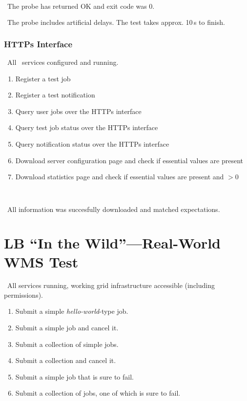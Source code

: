 \how\ 

\result\ The probe has returned OK and exit code was 0.

\note\ The probe includes artificial delays. The test takes approx. 10\,s to finish.

\subsubsection{HTTPs Interface}
\label{permissions}
\req\ All \LB\ services configured and running.

\what
\begin{enumerate}
\item Register a test job
\item Register a test notification
\item Query user jobs over the HTTPs interface
\item Query test job status over the HTTPs interface
\item Query notification status over the HTTPs interface
\item Download server configuration page and check if essential values are present
\item Download statistics page and check if essential values are present and $> 0$
\end{enumerate}

\how\ 

\result\ All information was succesfully downloaded and matched expectations.


\section{LB ``In the Wild''---Real-World WMS Test}
\req\ All \LB services running, working grid infrastructure accessible (including permissions). 

\what
\begin{enumerate}
\item Submit a simple \emph{hello-world}-type job.
\item Submit a simple job and cancel it.
\item Submit a collection of simple jobs.
\item Submit a collection and cancel it. 
\item Submit a simple job that is sure to fail.
\item Submit a collection of jobs, one of which is sure to fail. 
\end{enumerate}

